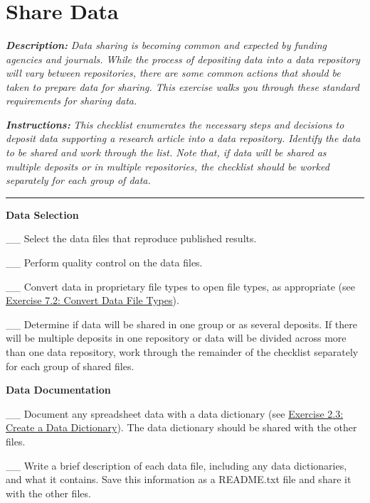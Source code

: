 \documentclass[
]{book}
\begin{document}
~

~

~

\hypertarget{share-data}{%
\section{Share Data}\label{share-data}}

\textbf{\emph{Description:}} \emph{Data sharing is becoming common and expected by funding agencies and journals. While the process of depositing data into a data repository will vary between repositories, there are some common actions that should be taken to prepare data for sharing. This exercise walks you through these standard requirements for sharing data.}

\textbf{\emph{Instructions:}} \emph{This checklist enumerates the necessary steps and decisions to deposit data supporting a research article into a data repository. Identify the data to be shared and work through the list. Note that, if data will be shared as multiple deposits or in multiple repositories, the checklist should be worked separately for each group of data.}

\begin{center}\rule{0.5\linewidth}{0.5pt}\end{center}

\textbf{Data Selection}

\_\_ Select the data files that reproduce published results.

\_\_ Perform quality control on the data files.

\_\_ Convert data in proprietary file types to open file types, as appropriate (see \protect\hyperlink{file-type}{Exercise 7.2: Convert Data File Types}).

\_\_ Determine if data will be shared in one group or as several deposits. If there will be multiple deposits in one repository or data will be divided across more than one data repository, work through the remainder of the checklist separately for each group of shared files.

\textbf{Data Documentation}

\_\_ Document any spreadsheet data with a data dictionary (see \protect\hyperlink{data-dictionary}{Exercise 2.3: Create a Data Dictionary}). The data dictionary should be shared with the other files.

\_\_ Write a brief description of each data file, including any data dictionaries, and what it contains. Save this information as a README.txt file and share it with the other files.
\end{document}
